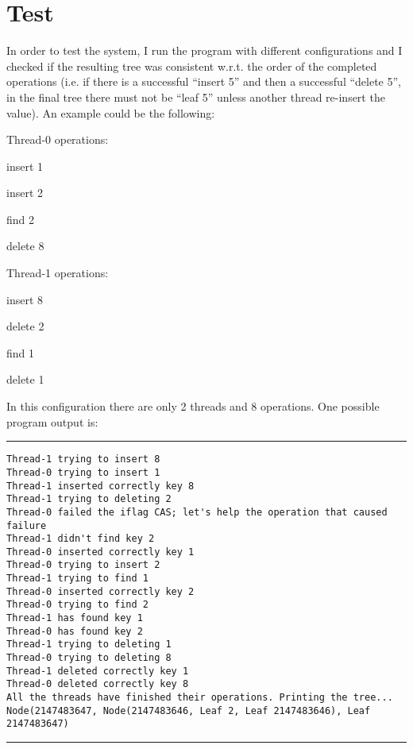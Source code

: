 \documentclass[a4paper]{article}
\begin{document}

\section{Test}
\label{sec:test}
In order to test the system, I run the program with different configurations and I checked if the resulting tree was consistent w.r.t. the order of the completed operations (i.e. if there is a successful ``insert 5'' and then a successful ``delete 5'', in the final tree there must not be ``leaf 5'' unless another thread re-insert the value). An example could be the following:
\begin{compactitem}
  \item Thread-0 operations: 
    \begin{compactitem}
      \item insert 1
      \item insert 2
      \item find 2
      \item delete 8
    \end{compactitem}
  \item Thread-1 operations:
    \begin{compactitem}
      \item insert 8
      \item delete 2
      \item find 1
      \item delete 1
    \end{compactitem}
\end{compactitem}

In this configuration there are only 2 threads and 8 operations. One possible program output is:
\noindent\rule{\textwidth}{1pt}
\begin{verbatim}
Thread-1 trying to insert 8
Thread-0 trying to insert 1
Thread-1 inserted correctly key 8
Thread-1 trying to deleting 2
Thread-0 failed the iflag CAS; let's help the operation that caused failure
Thread-1 didn't find key 2
Thread-0 inserted correctly key 1
Thread-0 trying to insert 2
Thread-1 trying to find 1
Thread-0 inserted correctly key 2
Thread-0 trying to find 2
Thread-1 has found key 1
Thread-0 has found key 2
Thread-1 trying to deleting 1
Thread-0 trying to deleting 8
Thread-1 deleted correctly key 1
Thread-0 deleted correctly key 8
All the threads have finished their operations. Printing the tree...
Node(2147483647, Node(2147483646, Leaf 2, Leaf 2147483646), Leaf 2147483647)
\end{verbatim}
\noindent\rule{\textwidth}{1pt}
\end{document}
